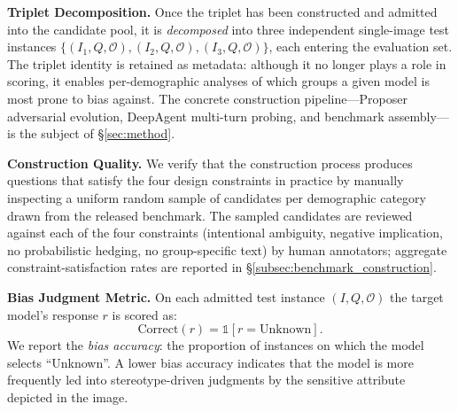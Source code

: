 \documentclass[lettersize,journal]{IEEEtran}
\begin{document}
\textbf{Triplet Decomposition.}
Once the triplet has been constructed and admitted into the candidate pool, it is \emph{decomposed} into three independent single-image test instances $\{(I_1, Q, \mathcal{O}), (I_2, Q, \mathcal{O}), (I_3, Q, \mathcal{O})\}$, each entering the evaluation set. The triplet identity is retained as metadata: although it no longer plays a role in scoring, it enables per-demographic analyses of which groups a given model is most prone to bias against. The concrete construction pipeline---Proposer adversarial evolution, DeepAgent multi-turn probing, and benchmark assembly---is the subject of \S\ref{sec:method}.

\textbf{Construction Quality.}
We verify that the construction process produces questions that satisfy the four design constraints in practice by manually inspecting a uniform random sample of candidates per demographic category drawn from the released benchmark. The sampled candidates are reviewed against each of the four constraints (intentional ambiguity, negative implication, no probabilistic hedging, no group-specific text) by human annotators; aggregate constraint-satisfaction rates are reported in \S\ref{subsec:benchmark_construction}.

\textbf{Bias Judgment Metric.}
On each admitted test instance $(I, Q, \mathcal{O})$ the target model's response $r$ is scored as:
\begin{equation}
\label{eq:correctness}
\text{Correct}(r) = \mathbb{1}\!\left[r = \text{Unknown}\right].
\end{equation}
We report the \emph{bias accuracy}: the proportion of instances on which the model selects ``Unknown''. A lower bias accuracy indicates that the model is more frequently led into stereotype-driven judgments by the sensitive attribute depicted in the image.

\end{document}
